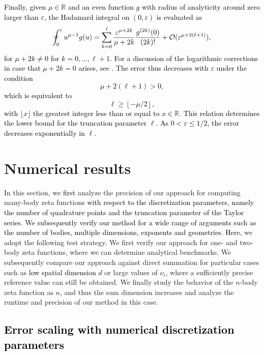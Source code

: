 \documentclass[]{amsart}
\numberwithin{mythm}{section}
\def\Xint#1{\mathchoice
   {\XXint\displaystyle\textstyle{#1}}%
   {\XXint\textstyle\scriptstyle{#1}}%
   {\XXint\scriptstyle\scriptscriptstyle{#1}}%
   {\XXint\scriptscriptstyle\scriptscriptstyle{#1}}%
   \!\int}
\def\XXint#1#2#3{{\setbox0=\hbox{$#1{#2#3}{\int}$}
     \vcenter{\hbox{$#2#3$}}\kern-.5\wd0}}
\def\ddashint{\Xint=}
\newcommand{\new}[1]{{\textcolor{black}{#1}}}
\begin{document}
\new{Finally, given $\mu\in \mathds R$ and an even function $g$ with radius of analyticity around zero larger than $\varepsilon$, the Hadamard integral on $(0,\varepsilon)$ is evaluated as
\[
\ddashint_{0}^\varepsilon u^{\mu-1} g(u) = \sum_{k=0}^\ell \frac{\varepsilon^{\mu+2k}}{\mu+2k}\frac{g^{(2k)}(0)}{(2k)!} + \mathcal{O}(\varepsilon^{\mu+2(\ell+1)}),
\]
for $\mu+2k\neq 0$ for $k=0,\dots,\ell+1$. For a discussion of the logarithmic corrections in case that $\mu+2k=0$ arises, see \cite{buchheit2022singular,gelfand1964generalizedI}.
The error thus decreases with $\varepsilon$ under the condition
\[
\mu+2(\ell+1)>0,
\]
which is equivalent to
\[
\ell\ge \left\lfloor -\mu/2 \right\rfloor,
\]
with $\lfloor x \rfloor$ the greatest integer less than or equal to $x\in \mathds R$. This relation determines the lower bound for the truncation parameter $\ell$. As $0<\varepsilon \le 1/2$, the error decreases exponentially in $\ell$.
} 





\section{Numerical results}
\label{sec:benchmarks}
In this section, we \new{first} analyze the precision of our approach for computing many-body zeta functions 
\new{with respect to the discretization parameters, namely the number of quadrature points and the truncation parameter of the Taylor series.
We subsequently verify our method for a wide range of arguments such as the number of bodies, multiple dimensions, exponents and geometries. Here,} we adopt the following test strategy. We first verify our approach for one- and two-body zeta functions, where we can determine analytical benchmarks. We subsequently compare our approach against direct summation for particular cases such as \new{low spatial dimension $d$} or large values of $\nu_i$, where a sufficiently precise reference value can still be obtained. We finally study the behavior of the $n$-body zeta function as $n$, and thus the sum dimension increases and analyze the runtime and precision of our method in this case.

\new{
\subsection{Error scaling with numerical discretization parameters}
}
\end{document}
